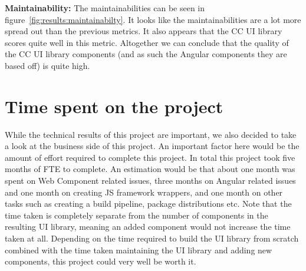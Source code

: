 \textbf{Maintainability:} The maintainabilities can be seen in figure~\ref{fig:results:maintainabilty}. It looks like the maintainabilities are a lot more spread out than the previous metrics. It also appears that the CC UI library scores quite well in this metric. Altogether we can conclude that the quality of the CC UI library components (and as such the Angular components they are based off) is quite high.

\section{Time spent on the project}\label{sec:results:time-spent}
While the technical results of this project are important, we also decided to take a look at the business side of this project. An important factor here would be the amount of effort required to complete this project. In total this project took five months of FTE to complete. An estimation would be that about one month was spent on Web Component related issues, three months on Angular related issues and one month on creating JS framework wrappers, and one month on other tasks such as creating a build pipeline, package distributions etc. Note that the time taken is completely separate from the number of components in the resulting UI library, meaning an added component would not increase the time taken at all. Depending on the time required to build the UI library from scratch combined with the time taken maintaining the UI library and adding new components, this project could very well be worth it.